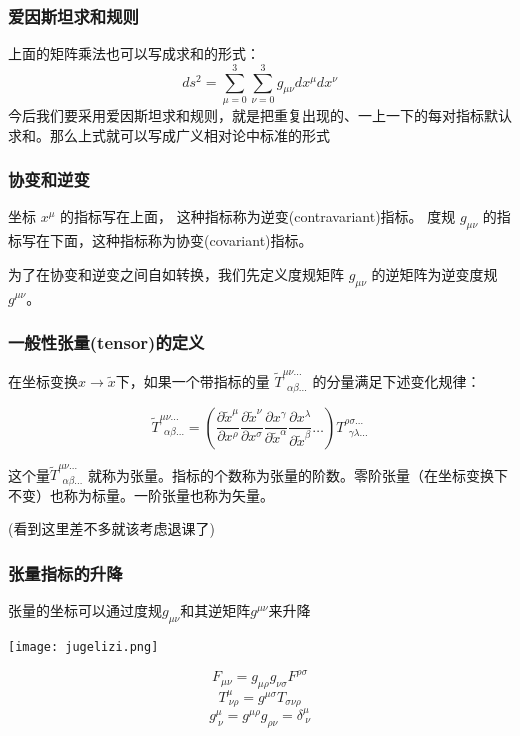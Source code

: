 \documentclass[CJK,13pt]{beamer}
\begin{document}
\begin{frame}
  \frametitle{爱因斯坦求和规则}
  上面的矩阵乘法也可以写成求和的形式：
$$ds^2 = \sum_{\mu=0}^3\sum_{\nu=0}^3 g_{\mu\nu} dx^\mu dx^\nu$$
今后我们要采用爱因斯坦求和规则，就是把{\blue 重复出现的、一上一下的每对指标默认求和}。那么上式就可以写成广义相对论中标准的形式
\end{frame}

\begin{frame}
  \frametitle{协变和逆变}
  坐标 $x^\mu$ 的指标写在上面， 这种指标称为{\blue 逆变(contravariant)指标}。
  度规 $g_{\mu\nu}$ 的指标写在下面，这种指标称为{\blue 协变(covariant)指标}。


  \skiplines
  
  为了在协变和逆变之间自如转换，我们先定义{\blue 度规矩阵 $g_{\mu\nu}$ 的逆矩阵为逆变度规 $g^{\mu\nu}$}。

\end{frame}

\begin{frame}
\frametitle{ 一般性张量(tensor)的定义 }

在坐标变换$x \rightarrow \tilde{x}$下，如果一个带指标的量 $\tilde{T}^{\mu\nu\ldots}_{\ \ \alpha\beta\ldots}$ 的分量满足下述变化规律：


$$\tilde{T}^{\mu\nu\ldots}_{\ \ \alpha\beta\ldots} = \left(\frac{\partial \tilde{x}^\mu}{\partial x^\rho}\frac{\partial \tilde{x}^\nu}{\partial x^\sigma} \frac{\partial x^\gamma }{\partial \tilde{x}^\alpha}\frac{\partial x^\lambda}{\partial \tilde{x}^\beta} \ldots \right)T^{\rho\sigma\ldots}_{\ \ \gamma\lambda\ldots} $$

这个量$\tilde{T}^{\mu\nu\ldots}_{\ \ \alpha\beta\ldots}$ 就称为张量。指标的个数称为张量的阶数。零阶张量（在坐标变换下不变）也称为标量。一阶张量也称为矢量。

\skipline

(看到这里差不多就该考虑退课了\bye)

\end{frame}



\begin{frame}
\frametitle{ 张量指标的升降}

张量的坐标可以通过度规$g_{\mu\nu}$和其逆矩阵$g^{\mu\nu}$来升降

{\vskip 0.1in}

\begin{minipage}{0.3\textwidth}
\texttt{[image: jugelizi.png]}
\end{minipage}
\begin{minipage}{0.6\textwidth}
$$F_{\mu\nu} = g_{\mu\rho}g_{\nu\sigma}F^{\rho\sigma}$$
$$T^{\mu}_{\ \nu\rho} = g^{\mu\sigma} T_{\sigma\nu\rho}$$
$$g^{\mu}_{\ \nu} = g^{\mu\rho}g_{\rho\nu} = \delta^{\mu}_{\ \nu}$$
\end{minipage}
\end{frame}
\end{document}

